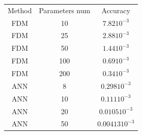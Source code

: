 \begin{tabular}{c c c}
 Method & Parameters num & Accuracy \\
 FDM & 10  & $7.82 10^{-3}$  \\
 FDM & 25  & $2.88 10^{-3}$  \\
 FDM & 50  & $1.44 10^{-3}$  \\
 FDM & 100  & $0.69 10^{-3}$ \\
  FDM & 200  & $0.34 10^{-3}$ \\
 ANN & 8  & $0.298 10^{-3}$  \\
 ANN & 10  & $0.111 10^{-3}$ \\
 ANN & 20  & $0.0105 10^{-3}$  \\
ANN & 50  & $0.00413 10^{-3}$
\end{tabular}